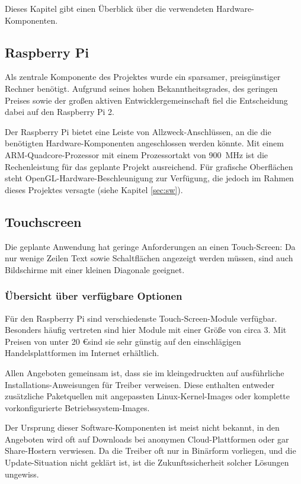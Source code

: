\documentclass[11pt,a4paper]{IEEEtran} \usepackage[ngerman]{babel}
\begin{document}
Dieses Kapitel gibt einen Überblick über die verwendeten Hardware-Komponenten.

\subsection{Raspberry Pi}

Als zentrale Komponente des Projektes wurde ein sparsamer, preisgünstiger
Rechner benötigt. Aufgrund seines hohen Bekanntheitsgrades, des geringen Preises 
sowie der großen aktiven Entwicklergemeinschaft fiel die Entscheidung dabei
auf den Raspberry Pi 2. 

Der Raspberry Pi bietet eine Leiste von Allzweck-Anschlüssen, an die die
benötigten Hardware-Komponenten angeschlossen werden könnte. Mit einem
ARM-Quadcore-Prozessor mit einem Prozessortakt von \SI{900}{\mega\hertz} ist
die Rechenleistung für das geplante Projekt ausreichend. Für grafische
Oberflächen steht OpenGL-Hardware-Beschleunigung zur Verfügung, die jedoch im 
Rahmen dieses Projektes versagte (siehe Kapitel \ref{sec:sw}).

\subsection{Touchscreen}

Die geplante Anwendung hat geringe Anforderungen an einen Touch-Screen: Da nur
wenige Zeilen Text sowie Schaltflächen angezeigt werden müssen, sind auch
Bildschirme mit einer kleinen Diagonale geeignet.

\subsubsection{Übersicht über verfügbare Optionen}

Für den Raspberry Pi sind verschiedenste Touch-Screen-Module verfügbar.
Besonders häufig vertreten sind hier Module mit einer Größe von circa
\SI{3}{\inch}. Mit Preisen von unter 20 \euro sind sie sehr günstig auf den
einschlägigen Handelsplattformen im Internet erhältlich.

Allen Angeboten gemeinsam ist, dass sie im kleingedruckten auf ausführliche
Installations-Anweisungen für Treiber verweisen. Diese enthalten entweder
zusätzliche Paketquellen mit angepassten Linux-Kernel-Images oder komplette
vorkonfigurierte Betriebssystem-Images. 

Der Ursprung dieser Software-Komponenten ist meist nicht bekannt, in den
Angeboten wird oft auf Downloads bei anonymen Cloud-Plattformen oder gar
Share-Hostern verwiesen. Da die Treiber oft nur in Binärform vorliegen, und die
Update-Situation nicht geklärt ist, ist die Zukunftssicherheit solcher Lösungen
ungewiss.
\end{document}
